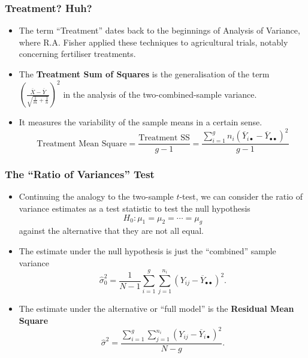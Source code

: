 \documentclass[a4paper]{article}
\begin{document}
\subsubsection{Treatment? Huh?}
\begin{itemize}
	\item The term ``Treatment'' dates back to the beginnings of Analysis of Variance, where R.A. Fisher applied these techniques to agricultural trials, notably concerning fertiliser treatments.
	\item The \textbf{Treatment Sum of Squares} is the generalisation of the term \( \left(\frac{\overline X-\overline Y}{\sqrt{\frac{1}{m}+\frac{1}{n}}}\right)^2 \) in the analysis of the two-combined-sample variance.
	\item It measures the variability of the sample means in a certain sense.
	\[
		\text{Treatment Mean Square} = \frac{\text{Treatment SS}}{g-1} = \frac{\sum_{i=1}^g n_i (\overline Y_{i\bullet}-\overline Y_{\bullet\bullet})^2}{g-1}
	\]
\end{itemize}
\subsubsection{The ``Ratio of Variances'' Test}
\begin{itemize}
	\item Continuing the analogy to the two-sample \( t \)-test, we can consider the ratio of variance estimates as a test statistic to test the null hypothesis
	\[
		H_0: \mu_1 = \mu_2 = \dotsb = \mu_g
	\]
	against the alternative that they are not all equal.
	\item The estimate under the null hypothesis is just the ``combined'' sample variance
	\[
		\hat{\sigma}^2_0 = \frac{1}{N-1}\sum_{i=1}^g\sum_{j=1}^{n_i}(Y_{ij}-\overline{Y}_{\bullet\bullet})^2.
	\]
	\item The estimate under the alternative or ``full model'' is the \textbf{Residual Mean Square}
	\[
		\hat\sigma^2=\frac{\sum_{i=1}^g\sum_{j=1}^{n_i}(Y_{ij}-\overline{Y}_{i\bullet})^2}{N-g}.
	\]
\end{itemize}
\end{document}
